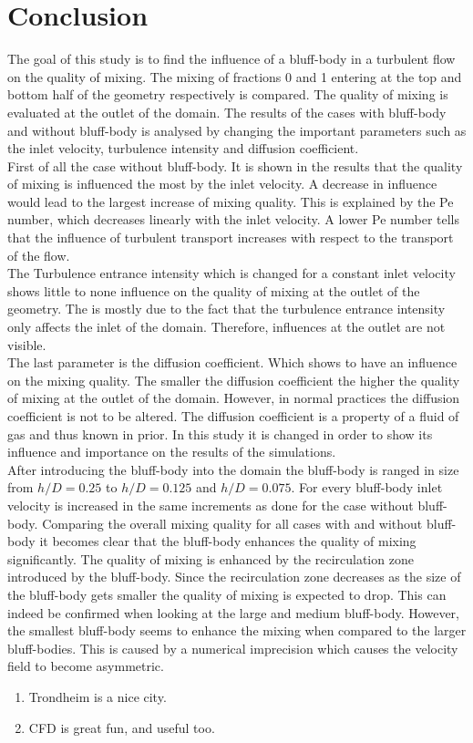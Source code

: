 \documentclass{CFD2017}
\begin{document}
\section{Conclusion}
The goal of this study is to find the influence of a bluff-body in a turbulent flow on the quality of mixing. The mixing of fractions 0 and 1 entering at the top and bottom half of the geometry respectively is compared. The quality of mixing is evaluated at the outlet of the domain.  The results of the cases with bluff-body and without bluff-body is analysed by changing the important parameters such as the inlet velocity, turbulence intensity and diffusion coefficient.\\
First of all the case without bluff-body. It is shown in the results that the quality of mixing is influenced the most by the inlet velocity. A decrease in influence would lead to the largest increase of mixing quality. This is explained by the Pe number, which decreases linearly with the inlet velocity. A lower Pe number tells that the influence of turbulent transport increases with respect to the transport of the flow.\\
The Turbulence entrance intensity which is changed for a constant inlet velocity shows little to none influence on the quality of mixing at the outlet of the geometry. The is mostly due to the fact that the turbulence entrance intensity only affects the inlet of the domain. Therefore, influences at the outlet are not visible.\\
The last parameter is the diffusion coefficient. Which shows to have an influence on the mixing quality. The smaller the diffusion coefficient the higher the quality of mixing at the outlet of the domain. However, in normal practices the diffusion coefficient is not to be altered. The diffusion coefficient is a property of a fluid of gas and thus known in prior. In this study it is changed in order to show its influence and importance on the results of the simulations.\\
After introducing the bluff-body into the domain the bluff-body is ranged in size from $h/D=0.25 $ to $h/D=0.125 $ and $h/D=0.075$. For every bluff-body inlet velocity is increased in the same increments as done for the case without bluff-body. Comparing the overall mixing quality for all cases with and without bluff-body it becomes clear that the bluff-body enhances the quality of mixing significantly. The quality of mixing is enhanced by the recirculation zone introduced by the bluff-body. Since the recirculation zone decreases as the size of the bluff-body gets smaller the quality of mixing is expected to drop. This can indeed be confirmed when looking at the large and medium bluff-body. However, the smallest bluff-body seems to enhance the mixing when compared to the larger bluff-bodies. This is caused by a numerical imprecision which causes the velocity field to become asymmetric.
\begin{enumerate}
  \item Trondheim is a nice city.
  \item CFD is great fun, and useful too.
\end{enumerate}
\end{document}
